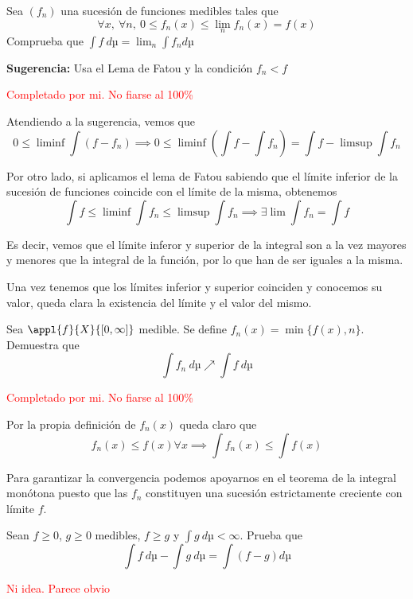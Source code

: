 \begin{problem}[6]

Sea $(f_n)$ una sucesión de funciones medibles tales que
\[\forall x, \ \forall n, \ 0 \leq f_n(x) \leq \lim_n f_n(x)=f(x)\]
Comprueba que
$\int f\ dµ = \lim_n \int f_n dµ$

\textbf{Sugerencia:} Usa el Lema de Fatou y la condición $f_n < f$

\solution
\textcolor{red}{Completado por mi. No fiarse al 100\%}

Atendiendo a la sugerencia, vemos que
\[0 \leq \liminf \int (f-f_n) \implies 0 \leq \liminf(\int f - \int f_n) = \int f - \limsup \int f_n\]

Por otro lado, si aplicamos el lema de Fatou sabiendo que el límite inferior de la sucesión de funciones coincide con el límite de la misma, obtenemos
\[\int f \leq \liminf \int f_n \leq \limsup \int f_n \implies \exists \lim \int f_n = \int f \]

Es decir, vemos que el límite inferor y superior de la integral son a la vez mayores y menores que la integral de la función, por lo que han de ser iguales a la misma.

Una vez tenemos que los límites inferior y superior coinciden y conocemos su valor, queda clara la existencia del límite y el valor del mismo.
\end{problem}

\begin{problem}[7]
Sea $\appl{f}{X}{[0,\infty]}$ medible. Se define $f_n(x)=\min\{f(x), n\}$. Demuestra que
\[\int f_n \ dµ \nearrow \int f \ dµ\]

\solution
\textcolor{red}{Completado por mi. No fiarse al 100\%}

Por la propia definición de $f_n(x)$ queda claro que
\[f_n(x) \leq f(x) \forall x \implies \int f_n(x) \leq \int f(x)\]

Para garantizar la convergencia podemos apoyarnos en el teorema de la integral monótona puesto que las $f_n$ constituyen una sucesión estrictamente creciente con límite $f$.

\end{problem}

\begin{problem}[8]
Sean $f\geq 0$, $g\geq 0$ medibles, $f\geq g$ y $\int g \ dµ < \infty$. Prueba que
\[\int f \ dµ - \int g \ dµ = \int (f-g)dµ\]

\solution
\textcolor{red}{Ni idea. Parece obvio}

\end{problem}

